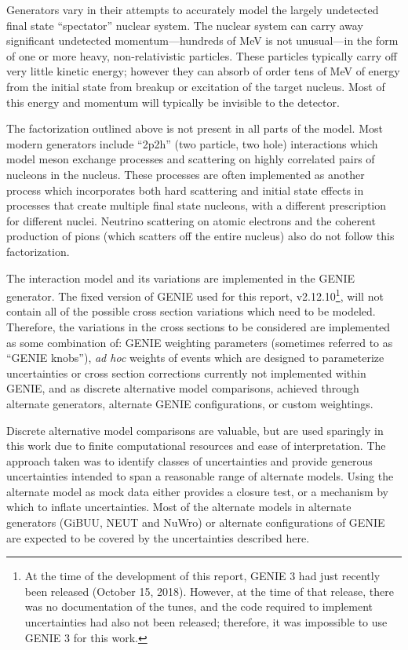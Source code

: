 Generators vary in their attempts to accurately model the largely undetected final state ``spectator'' nuclear system.  The nuclear system can carry away significant undetected momentum---hundreds of MeV is not unusual---in the form of one or more heavy, non-relativistic particles.  These particles typically carry off very little kinetic energy; however they can absorb of order tens of MeV of energy from the initial state from breakup or excitation of the target nucleus.  Most of this energy and momentum will typically be invisible to the detector. 

The factorization outlined above is not present in all parts of the model.  Most modern generators include ``2p2h'' (two particle, two hole) interactions which model meson exchange processes and scattering on highly correlated pairs of nucleons in the nucleus.  These processes are often implemented as another process which incorporates both hard scattering and initial state effects in processes that create multiple final state nucleons, with a different prescription for different nuclei.
Neutrino scattering on atomic electrons and the coherent production of pions (which scatters off the entire nucleus) also
do not follow this factorization. 

The interaction model and its variations are implemented in the  GENIE generator.  The fixed version of GENIE used for this report, v2.12.10\footnote{At the time of the development of this report, GENIE 3 had just recently been released (October 15, 2018).  However, at the time of that release, there was no documentation of the tunes, and the code required to implement uncertainties had also not been released; therefore, it was impossible to use GENIE 3 for this work.}, will not contain all of the possible cross section variations which need to be modeled.  Therefore, the variations in the cross sections to be considered are implemented as some combination of: GENIE weighting parameters (sometimes referred to as ``GENIE knobs''), {\it ad hoc} weights of events which are designed to parameterize uncertainties or cross section corrections currently not implemented within GENIE, and as discrete alternative model comparisons, achieved through alternate generators, alternate GENIE configurations, or custom weightings. 

Discrete alternative model comparisons are valuable, but are used sparingly in this work due to finite computational resources and ease of interpretation. The approach taken was to identify classes of uncertainties and provide generous uncertainties intended to span a reasonable range of alternate models. Using the alternate model as mock data either provides a closure test, or a mechanism by which to inflate uncertainties. Most of the alternate models in alternate generators (GiBUU, NEUT and NuWro) or alternate configurations of GENIE are expected to be covered by the uncertainties described here. 

